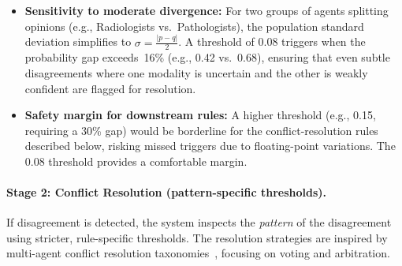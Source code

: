 \documentclass[12pt]{article}
\begin{document}
\begin{itemize}
    \item \textbf{Sensitivity to moderate divergence:} For two groups of agents splitting opinions (e.g., Radiologists vs.\ Pathologists), the population standard deviation simplifies to $\sigma = \frac{|p - q|}{2}$. A threshold of 0.08 triggers when the probability gap exceeds~16\% (e.g., 0.42 vs.\ 0.68), ensuring that even subtle disagreements where one modality is uncertain and the other is weakly confident are flagged for resolution.
    \item \textbf{Safety margin for downstream rules:} A higher threshold (e.g., 0.15, requiring a 30\% gap) would be borderline for the conflict-resolution rules described below, risking missed triggers due to floating-point variations. The 0.08 threshold provides a comfortable margin.
\end{itemize}

\paragraph{Stage 2: Conflict Resolution (pattern-specific thresholds).}
If disagreement is detected, the system inspects the \emph{pattern} of the disagreement using stricter, rule-specific thresholds. The resolution strategies are inspired by multi-agent conflict resolution taxonomies~\cite{atoms2025conflictresolution}, focusing on voting and arbitration.
\end{document}

